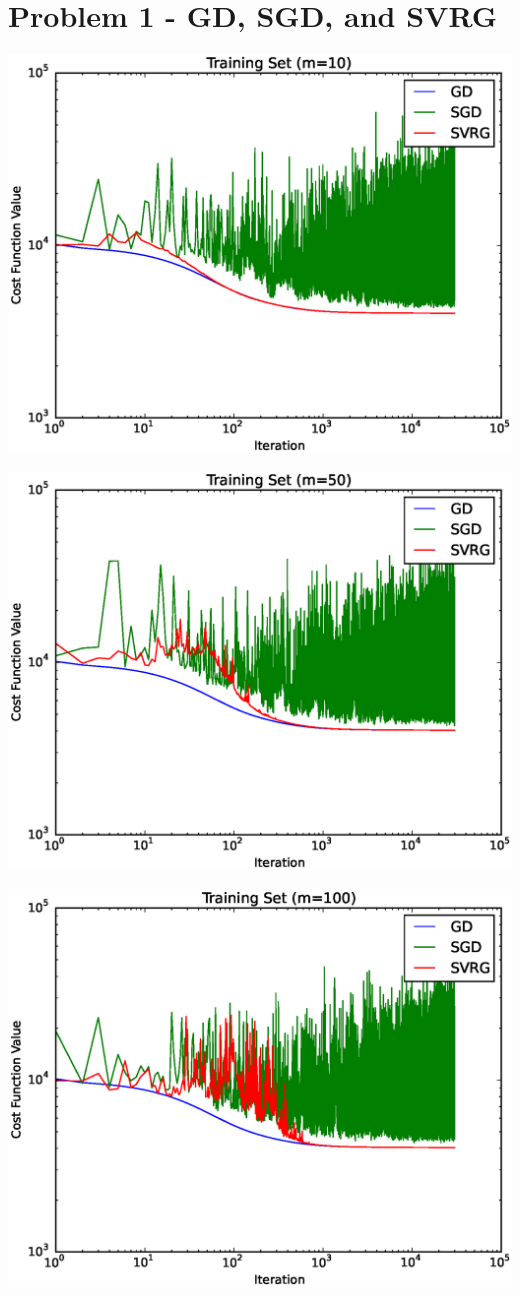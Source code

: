 \documentclass[a4paper]{article}
\begin{document}
\renewcommand{\theFancyVerbLine}{
  \sffamily\textcolor[rgb]{0.5,0.5,0.5}{\scriptsize\arabic{FancyVerbLine}}}

\section{Problem 1 - GD, SGD, and SVRG}

  \includegraphics[scale=0.5]{p1_training_m=10.eps}

  \includegraphics[scale=0.5]{p1_training_m=50.eps}

  \includegraphics[scale=0.5]{p1_training_m=100.eps}


\inputminted{python}{hw6_p1.py}
\end{document}

